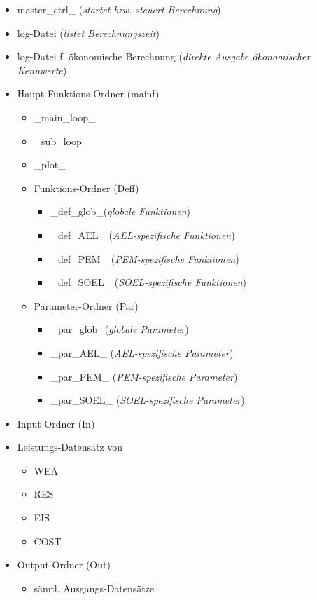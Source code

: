\documentclass[onecolumn,10pt,titlepage]{article}
\begin{document}
\begin{itemize}
	\item master\_ctrl\_ (\textit{startet bzw. steuert Berechnung})
	\item log-Datei (\textit{listet Berechnungszeit})
	\item log-Datei f. ökonomische Berechnung (\textit{direkte Ausgabe ökonomischer Kennwerte})
	\item Haupt-Funktions-Ordner (mainf)
	\begin{itemize} 
		\item \_main\_loop\_
		\item \_sub\_loop\_
		\item \_plot\_
		\item Funktions-Ordner (Deff)
		\begin{itemize}
			\item \_def\_glob\_(\textit{globale Funktionen})
			\item \_def\_AEL\_ (\textit{AEL-spezifische Funktionen})
			\item \_def\_PEM\_ (\textit{PEM-spezifische Funktionen})
			\item \_def\_SOEL\_ (\textit{SOEL-spezifische Funktionen})
		\end{itemize}
		\item Parameter-Ordner (Par)
		\begin{itemize}
			\item \_par\_glob\_(\textit{globale Parameter})
			\item \_par\_AEL\_ (\textit{AEL-spezifische Parameter})
			\item \_par\_PEM\_ (\textit{PEM-spezifische Parameter})
			\item \_par\_SOEL\_ (\textit{SOEL-spezifische Parameter})
		\end{itemize}
	\end{itemize}
	\item Input-Ordner (In)
	\item[] Leistungs-Datensatz von
	\begin{itemize}
		\item WEA
		\item RES
		\item EIS
		\item COST
	\end{itemize}
	\item Output-Ordner (Out)
	\begin{itemize}
		\item sämtl. Ausgangs-Datensätze
	\end{itemize}
	
\end{itemize}
\end{document}
